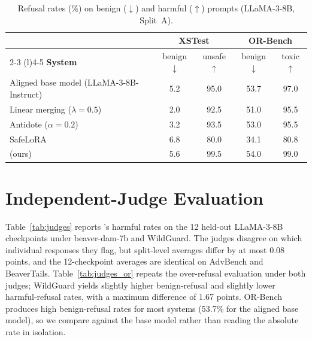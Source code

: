 \begin{table}[htbp]
\centering
\caption{Refusal rates (\%) on benign ($\downarrow$) and harmful ($\uparrow$) prompts (LLaMA-3-8B, Split~A).}
\label{tab:overrefusal_all}
\small
\setlength{\tabcolsep}{6pt}
\begin{tabular}{@{}lcccc@{}}
\toprule
 & \multicolumn{2}{c}{\textbf{XSTest}} & \multicolumn{2}{c}{\textbf{OR-Bench}} \\
\cmidrule(lr){2-3} \cmidrule(l){4-5}
\textbf{System} & benign$\downarrow$ & unsafe$\uparrow$ & benign$\downarrow$ & toxic$\uparrow$ \\
\midrule
Aligned base model (LLaMA-3-8B-Instruct) & 5.2 & 95.0 & 53.7 & 97.0 \\
Linear merging ($\lambda{=}0.5$) & 2.0 & 92.5 & 51.0 & 95.5 \\
Antidote ($\alpha{=}0.2$)        & 3.2 & 93.5 & 53.0 & 95.5 \\
SafeLoRA                         & 6.8 & 80.0 & 34.1 & 80.8 \\
\method{} (ours)                 & 5.6 & 99.5 & 54.0 & 99.0 \\
\bottomrule
\end{tabular}
\end{table}

\section{Independent-Judge Evaluation}
\label{app:judges}
Table~\ref{tab:judges} reports \method{}'s harmful rates on the 12 held-out LLaMA-3-8B checkpoints under beaver-dam-7b and WildGuard. The judges disagree on which individual responses they flag, but split-level averages differ by at most 0.08 points, and the 12-checkpoint averages are identical on AdvBench and BeaverTails. Table~\ref{tab:judges_or} repeats the over-refusal evaluation under both judges; WildGuard yields slightly higher benign-refusal and slightly lower harmful-refusal rates, with a maximum difference of 1.67 points. OR-Bench produces high benign-refusal rates for most systems (53.7\% for the aligned base model), so we compare against the base model rather than reading the absolute rate in isolation.

